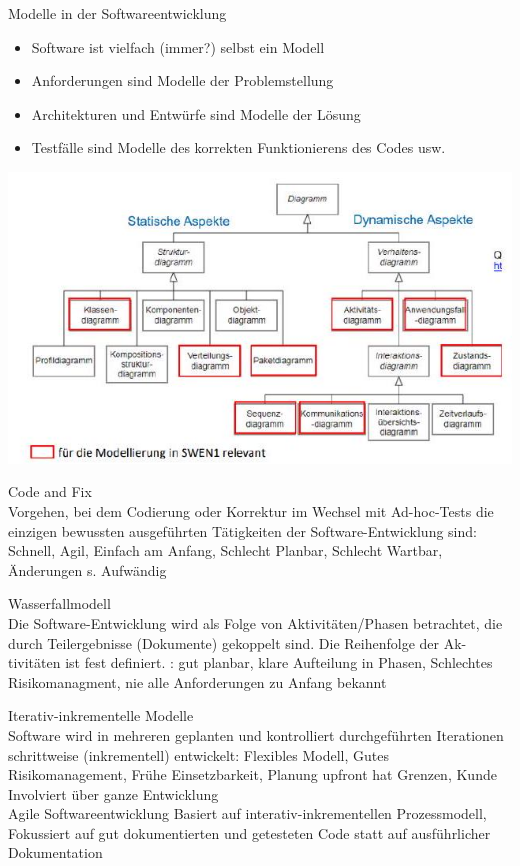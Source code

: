 \begin{concept}{Modelle in der Softwareentwicklung}
\begin{itemize}
  \item Software ist vielfach (immer?) selbst ein Modell
  \item Anforderungen sind Modelle der Problemstellung
  \item Architekturen und Entwürfe sind Modelle der Lösung
  \item Testfälle sind Modelle des korrekten Funktionierens des Codes usw.
\end{itemize}
\includegraphics[width=\linewidth]{images/2024_12_29_0d1d7b5551ea1b4b41bdg-01(1)}
\end{concept}

\begin{definition}{Code and Fix}\\
Vorgehen, bei dem Codierung oder Korrektur im Wechsel mit Ad-hoc-Tests die einzigen bewussten ausgeführten Tätigkeiten der Software-Entwicklung sind: Schnell, Agil, Einfach am Anfang, Schlecht Planbar, Schlecht Wartbar, Änderungen s. Aufwändig
\end{definition}

\begin{definition}{Wasserfallmodell}\\
Die Software-Entwicklung wird als Folge von Aktivitäten/Phasen betrachtet, die durch Teilergebnisse (Dokumente) gekoppelt sind. Die Reihenfolge der Ak-\\
tivitäten ist fest definiert. : gut planbar, klare Aufteilung in Phasen, Schlechtes Risikomanagment, nie alle Anforderungen zu Anfang bekannt
\end{definition}

\begin{definition}{Iterativ-inkrementelle Modelle}\\
Software wird in mehreren geplanten und kontrolliert durchgeführten Iterationen schrittweise (inkrementell) entwickelt: Flexibles Modell, Gutes Risikomanagement, Frühe Einsetzbarkeit, Planung upfront hat Grenzen, Kunde Involviert über ganze Entwicklung\\
Agile Softwareentwicklung Basiert auf interativ-inkrementellen Prozessmodell, Fokussiert auf gut dokumentierten und getesteten Code statt auf ausführlicher Dokumentation
\end{definition}

